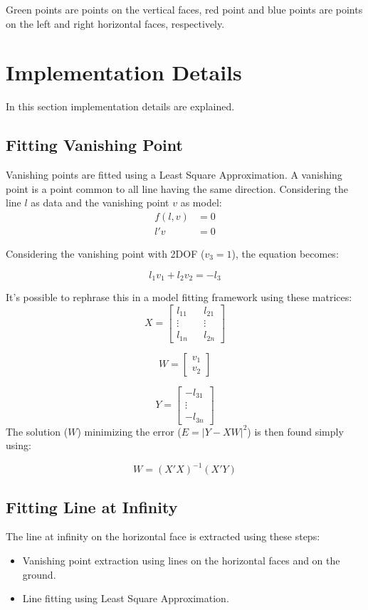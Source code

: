 \documentclass[11pt, oneside]{article}   	%
\begin{document}
Green points are points on the vertical faces, red point and blue points are points on the left and right horizontal faces, respectively.

\section{Implementation Details}
In this section implementation details are explained.
\subsection{Fitting Vanishing Point} \label{secvp}
Vanishing points are fitted using a Least Square Approximation.
A vanishing point is a point common to all line having the same direction. 
Considering the line $l$ as data and the vanishing point $v$ as model:
\begin{subequations}
\begin{align*}
f(l,v)&=0 \\
l'v &= 0
\end{align*}
\end{subequations}

Considering the vanishing point with 2DOF ($v_3=1$), the equation becomes:

$$
l_1 v_1 + l_2 v_2 = -l_3
$$

It's possible to rephrase this in a model fitting framework using these matrices:
$$
X = \begin{bmatrix}
l_{11} && l_{21} \\
\vdots  && \vdots\\
l_{1n} && l_{2n}
\end{bmatrix}
$$ 

$$
W = 
\begin{bmatrix}
v_1 \\
v_2
\end{bmatrix}
$$

$$
Y =
\begin{bmatrix}
-l_{31} \\
\vdots \\
-l_{3n}
\end{bmatrix}
$$
The solution ($W$) minimizing the error ($E = |Y-XW|^2$) is then found simply using:

$$
W = (X'X)^{-1}(X'Y)
$$

\subsection{Fitting Line at Infinity}
The line at infinity on the horizontal face is extracted using these steps:
\begin{itemize}
\item Vanishing point extraction using lines on the horizontal faces and on the ground. 
\item Line fitting using Least Square Approximation.
\end{itemize}
\end{document}
